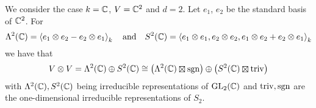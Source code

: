 \begin{example}
  We consider the case $k = \mathbb{C}$, $V = \mathbb{C}^2$ and $d = 2$.
  Let $e_1$, $e_2$ be the standard basis of $\mathbb{C}^2$.
  For
  \[
      \Lambda^2(\mathbb{C})
    = \left\langle  e_1 \mathbin{\otimes} e_2 - e_2 \mathbin{\otimes} e_1  \right\rangle_k
    \quad\text{and}\quad
      S^2(\mathbb{C})
    = \left\langle  e_1 \mathbin{\otimes} e_1, e_2 \mathbin{\otimes} e_2, e_1 \mathbin{\otimes} e_2 + e_2 \mathbin{\otimes} e_1  \right\rangle_k
  \]
  we have that
  \[
          V \tensor V
    =     \Lambda^2(\Complex) \oplus S^2(\Complex)
    \cong        \left( \Lambda^2(\Complex) \outertensor \sgn \right)
          \oplus \left( S^2(\Complex) \outertensor \triv \right)
  \]
  with $\Lambda^2(\mathbb{C}), S^2(\mathbb{C})$ being irreducible representations of $\operatorname{GL}_2(\mathbb{C})$ and $\operatorname{triv}, \operatorname{sgn}$ are the one-dimensional irreducible representations of $S_2$.
  
%     

\end{example}
